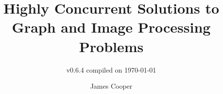 \documentclass[newzealand,10pt,partial,onehalfspace,examcopy,final]{aucklandthesis}
\theoremstyle{plain}
\begin{document}
\frontmatter

%
%
%
\title{Highly Concurrent Solutions to Graph and Image Processing Problems}
\subtitle{{\small v0.6.4 compiled on \today}}
\author{James Cooper}

\maketitle
{}




\cleardoublepage\tableofcontents
\cleardoublepage\listoffixmes
\cleardoublepage\listoffigures
\cleardoublepage\listoftables
\cleardoublepage\listofcprulesetfloats
\cleardoublepage\listofcpobjectsfloats
\cleardoublepage\printglossary
\cleardoublepage\printglossary[type=\acronymtype]









%
%
%
%
\end{document}
